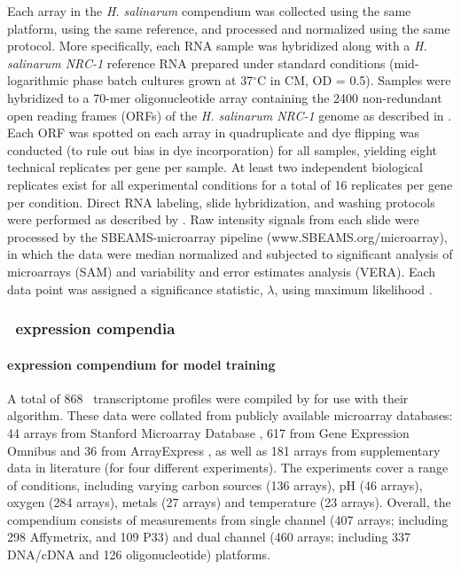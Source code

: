 Each array in the {\it H. salinarum} compendium was collected using the same platform, using the same reference, and processed and normalized using the same protocol. More specifically, each RNA sample was hybridized along with a {\it H. salinarum NRC-1} reference RNA prepared under standard conditions (mid-logarithmic phase batch cultures grown at 37$^{\circ}$C in CM, OD = 0.5). Samples were hybridized to a 70-mer oligonucleotide array containing the 2400 non-redundant open reading frames (ORFs) of the {\it H. salinarum NRC-1} genome as described in \cite{baliga_genome_2004}. Each ORF was spotted on each array in quadruplicate and dye flipping was conducted (to rule out bias in dye incorporation) for all samples, yielding eight technical replicates per gene per sample. At least two independent biological replicates exist for all experimental conditions for a total of 16 replicates per gene per condition. Direct RNA labeling, slide hybridization, and washing protocols were performed as described by \cite{facciotti_general_2007,schmid_anatomy_2007}. Raw intensity signals from each slide were processed by the SBEAMS-microarray pipeline \cite{marzolf_sbeams-microarray:_2006} (www.SBEAMS.org/microarray), in which the data were median normalized and subjected to significant analysis of microarrays (SAM) and variability and error estimates analysis (VERA). Each data point was assigned a significance statistic, $\lambda$, using maximum likelihood \cite{ideker_testing_2000}.

\subsubsection{\eco~expression compendia}\label{ecodata}

\paragraph{ expression compendium for model training}

A total of 868 \eco\ transcriptome profiles were compiled by \cite{lemmens_distiller:_2009} for use with their  algorithm. These data were collated from publicly available microarray databases: 44 arrays from Stanford Microarray Database \cite{demeter_stanford_2007}, 617 from Gene Expression Omnibus \cite{barrett_ncbi_2007} and 36 from ArrayExpress \cite{parkinson_arrayexpresspublic_2007}, as well as 181 arrays from supplementary data in literature (for four different experiments). The experiments cover a range of conditions, including varying carbon sources (136 arrays), pH (46 arrays), oxygen (284 arrays), metals (27 arrays) and temperature (23 arrays). Overall, the compendium consists of measurements from single channel (407 arrays; including 298 Affymetrix, and 109 P33) and dual channel (460 arrays; including 337 DNA/cDNA and 126 oligonucleotide) platforms.

